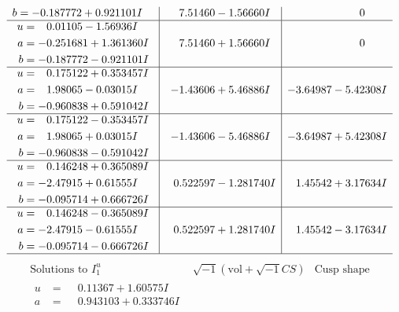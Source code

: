 \documentclass[1p]{elsarticle_modified}
\theoremstyle{definition}
\newcommand{\I}{\sqrt{-1}}
\begin{document}
$$\begin{array}{c|c|c}
\begin{aligned}
b &= -0.187772 + 0.921101 I\end{aligned}
 & \phantom{-}7.51460 - 1.56660 I & \phantom{-0.000000 } 0 \\ \hline\begin{aligned}
u &= \phantom{-}0.01105 - 1.56936 I \\
a &= -0.251681 + 1.361360 I \\
b &= -0.187772 - 0.921101 I\end{aligned}
 & \phantom{-}7.51460 + 1.56660 I & \phantom{-0.000000 } 0 \\ \hline\begin{aligned}
u &= \phantom{-}0.175122 + 0.353457 I \\
a &= \phantom{-}1.98065 - 0.03015 I \\
b &= -0.960838 + 0.591042 I\end{aligned}
 & -1.43606 + 5.46886 I & -3.64987 - 5.42308 I \\ \hline\begin{aligned}
u &= \phantom{-}0.175122 - 0.353457 I \\
a &= \phantom{-}1.98065 + 0.03015 I \\
b &= -0.960838 - 0.591042 I\end{aligned}
 & -1.43606 - 5.46886 I & -3.64987 + 5.42308 I \\ \hline\begin{aligned}
u &= \phantom{-}0.146248 + 0.365089 I \\
a &= -2.47915 + 0.61555 I \\
b &= -0.095714 + 0.666726 I\end{aligned}
 & \phantom{-}0.522597 - 1.281740 I & \phantom{-}1.45542 + 3.17634 I \\ \hline\begin{aligned}
u &= \phantom{-}0.146248 - 0.365089 I \\
a &= -2.47915 - 0.61555 I \\
b &= -0.095714 - 0.666726 I\end{aligned}
 & \phantom{-}0.522597 + 1.281740 I & \phantom{-}1.45542 - 3.17634 I\\
 \hline 
 \end{array}$$\newpage$$\begin{array}{c|c|c}  
\text{Solutions to }I^u_{1}& \I (\text{vol} + \sqrt{-1}CS) & \text{Cusp shape}\\
 \hline 
\begin{aligned}
u &= \phantom{-}0.11367 + 1.60575 I \\
a &= \phantom{-}0.943103 + 0.333746 I \\

\end{aligned}
\end{array}$$
\end{document}
